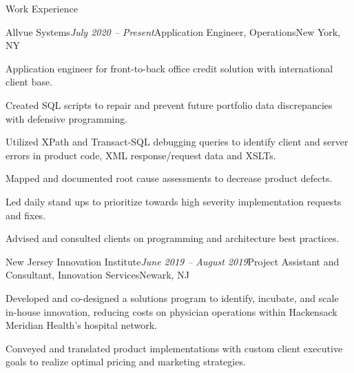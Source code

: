\documentclass[letterpaper]{resume} %
\begin{document}
\begin{rSection}{Work Experience}

\begin{rSubsection}{Allvue Systems}{\em July 2020 -- Present}{Application Engineer, Operations}{New York, NY}
	\item Application engineer for front-to-back office credit solution with international client base.
	\item Created SQL scripts to repair and prevent future portfolio data discrepancies with defensive programming.
	\item Utilized XPath and Transact-SQL debugging queries to identify client and server errors in product code, XML response/request data and XSLTs.
	\item Mapped and documented root cause assessments to decrease product defects.
	\item Led daily stand ups to prioritize towards high severity implementation requests and fixes.
	\item Advised and consulted clients on programming and architecture best practices.
\end{rSubsection}

\begin{rSubsection}{New Jersey Innovation Institute}{\em June 2019 -- August 2019}{Project Assistant and Consultant, Innovation Services}{Newark, NJ}
	\item Developed and co-designed a solutions program to identify, incubate, and scale in-house innovation, reducing costs on physician operations within Hackensack Meridian Health’s hospital network.
	\item Conveyed and translated product implementations with custom client executive goals to realize optimal pricing and marketing strategies.
 
\end{rSubsection}

\end{rSection}
\end{document}
